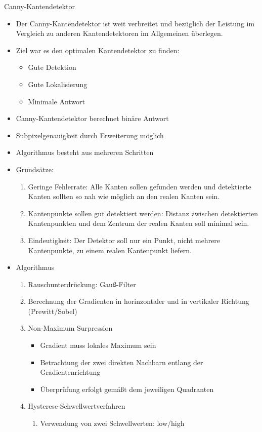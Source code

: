 \documentclass[paper=a4, fontsize=11pt]{scrartcl} %
\numberwithin{equation}{section} %
\numberwithin{figure}{section} %
\numberwithin{table}{section} %
\begin{document}
Canny-Kantendetektor
\begin{itemize}
\item Der Canny-Kantendetektor ist weit verbreitet und bezüglich der Leistung im Vergleich zu anderen Kantendetektoren im Allgemeinen überlegen.
\item Ziel war es den optimalen Kantendetektor zu finden:
\begin{itemize}
\item Gute Detektion
\item Gute Lokalisierung
\item Minimale Antwort
\end{itemize}
\item Canny-Kantendetektor berechnet binäre Antwort
\item Subpixelgenauigkeit durch Erweiterung möglich
\item Algorithmus besteht aus mehreren Schritten
\item Grundsätze:
\begin{enumerate}
\item Geringe Fehlerrate: Alle Kanten sollen gefunden werden und detektierte Kanten sollten so nah wie möglich an den realen Kanten sein.
\item Kantenpunkte sollen gut detektiert werden: Distanz zwischen detektierten Kantenpunkten und dem Zentrum der realen Kanten soll minimal sein.
\item Eindeutigkeit: Der Detektor soll nur ein Punkt, nicht mehrere Kantenpunkte, zu einem realen Kantenpunkt liefern.
\end{enumerate}
\item Algorithmus
\begin{enumerate}
\item Rauschunterdrückung: Gauß-Filter
\item Berechnung der Gradienten in horinzontaler und in vertikaler Richtung (Prewitt/Sobel)
\item Non-Maximum Surpression
\begin{itemize}
\item Gradient muss lokales Maximum sein
\item Betrachtung der zwei direkten Nachbarn entlang der Gradientenrichtung
\item Überprüfung erfolgt gemäßt dem jeweiligen Quadranten
\end{itemize}
\item Hysterese-Schwellwertverfahren
\begin{enumerate}
\item Verwendung von zwei Schwellwerten: low/high

\end{enumerate}
\end{enumerate}
\end{itemize}
\end{document}
